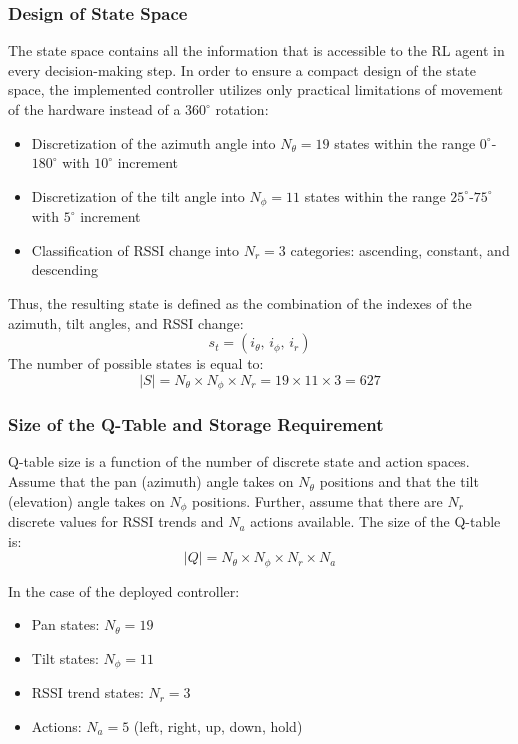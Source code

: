 \subsubsection{Design of State Space}
The state space contains all the information that is accessible to the RL agent in
every decision-making step. In order to ensure a compact design of the state space,
the implemented controller utilizes only practical limitations of movement of the
hardware instead of a $360^{\circ}$ rotation:
\begin{itemize}
    \item Discretization of the azimuth angle into $N_\theta = 19$ states
    within the range $0^{\circ}$-$180^{\circ}$ with $10^{\circ}$ increment
    \item Discretization of the tilt angle into $N_\phi = 11$ states
    within the range $25^{\circ}$-$75^{\circ}$ with $5^{\circ}$ increment
    \item Classification of RSSI change into $N_r = 3$ categories: ascending,
    constant, and descending
\end{itemize}
Thus, the resulting state is defined as the combination of the indexes of the
azimuth, tilt angles, and RSSI change:
\begin{equation}
s_t = \left(i_{\theta},\, i_{\phi},\, i_r \right)
\end{equation}
The number of possible states is equal to:
\begin{equation}
\left|S\right| = N_\theta \times N_\phi \times N_r = 19 \times 11 \times 3 = 627
\end{equation}


\subsubsection{Size of the Q-Table and Storage Requirement}

Q-table size is a function of the number of discrete state and action spaces. Assume
that the pan (azimuth) angle takes on $N_\theta$ positions and that the tilt
(elevation) angle takes on $N_\phi$ positions. Further, assume that there are $N_r$
discrete values for RSSI trends and $N_a$ actions available. The size of the
Q-table is:
\begin{equation}
\left|Q\right| = N_\theta \times N_\phi \times N_r \times N_a
\end{equation}

In the case of the deployed controller:
\begin{itemize}
    \item Pan states: $N_\theta = 19$
    \item Tilt states: $N_\phi = 11$
    \item RSSI trend states: $N_r = 3$
    \item Actions: $N_a = 5$ (left, right, up, down, hold)
\end{itemize}

